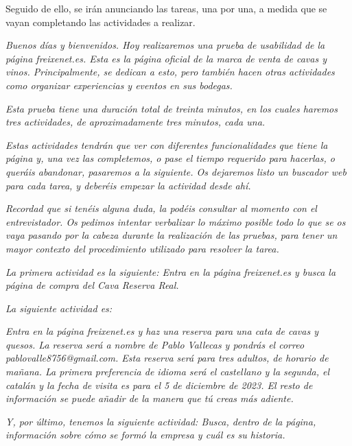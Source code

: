 \documentclass[spanish]{article}
\begin{document}
Seguido de ello, se irán anunciando las tareas, una por una,
a medida que se vayan completando las actividades a
realizar.\newline

\textit{Buenos días y bienvenidos. Hoy realizaremos una prueba de
usabilidad de la página freixenet.es. Esta es la página
oficial de la marca de venta de cavas y vinos.
Principalmente, se dedican a esto, pero también hacen otras
actividades como organizar experiencias y eventos en sus
bodegas.}\newline

\textit{Esta prueba tiene una duración total de treinta minutos, en
los cuales haremos tres actividades, de aproximadamente tres
minutos, cada una.}\newline

\textit{Estas actividades tendrán que ver con diferentes
funcionalidades que tiene la página y, una vez las
completemos, o pase el tiempo requerido para hacerlas, o
queráis abandonar, pasaremos a la siguiente. Os dejaremos
listo un buscador web para cada tarea, y deberéis empezar la
actividad desde ahí.}\newline

\textit{Recordad que si tenéis alguna duda, la podéis consultar al
momento con el entrevistador. Os pedimos intentar verbalizar
lo máximo posible todo lo que se os vaya pasando por la
cabeza durante la realización de las pruebas, para tener un
mayor contexto del procedimiento utilizado para resolver la
tarea.}\newline

\textit{La primera actividad es la siguiente:
Entra en la página freixenet.es y busca la página de compra
del Cava Reserva Real.}\newline

\newpage

\textit{La siguiente actividad es:}\newline

\textit{Entra en la página freixenet.es
y haz una reserva para una cata de cavas y quesos. La
reserva será a nombre de Pablo Vallecas y pondrás el correo
pablovalle8756@gmail.com. Esta reserva será para tres
adultos, de horario de mañana. La primera preferencia de
idioma será el castellano y la segunda, el catalán y la
fecha de visita es para el 5 de diciembre de 2023. El resto
de información se puede añadir de la manera que tú creas más
adiente.}\newline

\textit{Y, por último, tenemos la siguiente actividad:
Busca, dentro de la página, información sobre cómo se formó
la empresa y cuál es su historia.}\newline
\end{document}
